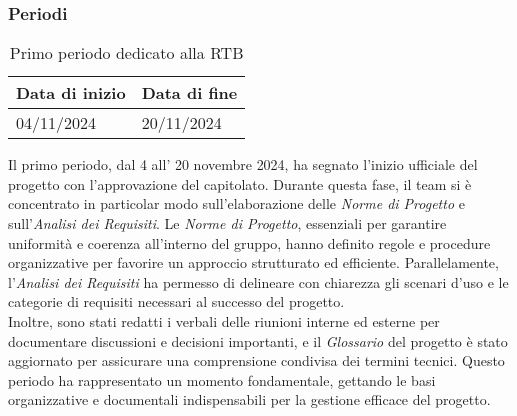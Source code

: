 \subsubsection{Periodi}
\label{sec:periodi}


\begin{table}[h!]
    \centering
    \renewcommand{\arraystretch}{1.5} %
    \begin{tabularx}{\textwidth}{|X|X|}\hline
    \rowcolor[HTML]{FFD700} 
    \textbf{Data di inizio} & \textbf{Data di fine} \\ \hline
    04/11/2024 & 20/11/2024 \\ \hline
    \end{tabularx}
    \caption{Primo periodo dedicato alla RTB}
\end{table}
Il primo periodo, dal 4 all' 20 novembre 2024, ha segnato l’inizio ufficiale del progetto con l’approvazione del capitolato. Durante questa fase, il team si è concentrato in particolar modo sull’elaborazione delle \textit{Norme di Progetto} e sull'\textit{Analisi dei Requisiti}. Le \textit{Norme di Progetto}, essenziali per garantire uniformità e coerenza all’interno del gruppo, hanno definito regole e procedure organizzative per favorire un approccio strutturato ed efficiente. Parallelamente, l’\textit{Analisi dei Requisiti} ha permesso di delineare con chiarezza gli scenari d’uso e le categorie di requisiti necessari al successo del progetto.\\
Inoltre, sono stati redatti i verbali delle riunioni interne ed esterne per documentare discussioni e decisioni importanti, e il \textit{Glossario} del progetto è stato aggiornato per assicurare una comprensione condivisa dei termini tecnici. Questo periodo ha rappresentato un momento fondamentale, gettando le basi organizzative e documentali indispensabili per la gestione efficace del progetto.

